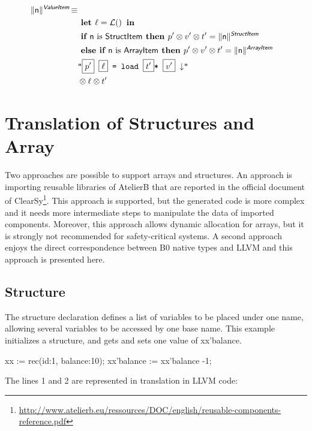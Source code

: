 \begin{align*}
\begin{split}
  \trad{n}{\B{ValueItem}} \isdef \\
   & \LET \ell = \lbl  \IN\\
   & \IF \B{n} \mbox{ is \B{StructItem}} \THEN p' \sep v' \sep t' = \trad{\B{n}}{\B{StructItem}} \\
   & \ELSIF \B{n} \mbox{ is \B{ArrayItem}} \THEN p' \sep v' \sep t' = \trad{\B{n}}{\B{ArrayItem}} \\
   & \llvm{"\PH{p'} \PH{\ell}  = load  \PH{t'}* \PH{v'} \nl"} \\
   & \sep  \ell  \sep t'\\
\end{split}
\end{align*}


\section{Translation of Structures and Array}
\label{sec:StructArray}

Two approaches are possible to support arrays and structures. An approach is 
importing reusable libraries of AtelierB that are reported in the official 
document of ClearSy\footnote{\url{http://www.atelierb.eu/ressources/DOC/english/reusable-components-reference.pdf}}. 
This approach is supported, but the generated code is more complex and it needs 
more intermediate steps to manipulate the data of imported components. 
Moreover, this approach allows dynamic allocation for arrays, but it is 
strongly not recommended for safety-critical systems. A second approach enjoys 
the direct correspondence between B0 native types and LLVM and this approach 
is presented here.

\subsection{Structure} 
The structure declaration defines a list of variables to be placed under one 
name, allowing several variables to be accessed by one base name. This example  
initializes a structure, and gets and sets one value of xx'balance. 
 
\begin{ccode}
xx := rec(id:1, balance:10);
xx'balance := xx'balance -1;
\end{ccode}
The lines 1 and 2 are represented in translation in LLVM code:

